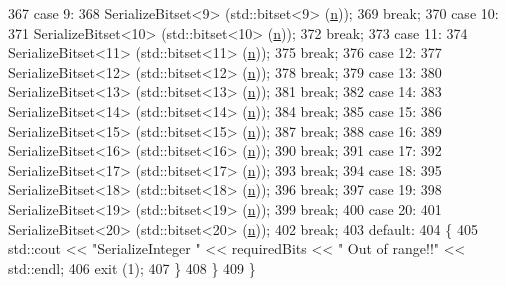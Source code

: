 \begin{DoxyCode}
367     \textcolor{keywordflow}{case} 9:
368       SerializeBitset<9> (std::bitset<9> (\hyperlink{namespacesample-rng-plot_aeb5ee5c431e338ef39b7ac5431242e1d}{n}));
369       \textcolor{keywordflow}{break};
370     \textcolor{keywordflow}{case} 10:
371       SerializeBitset<10> (std::bitset<10> (\hyperlink{namespacesample-rng-plot_aeb5ee5c431e338ef39b7ac5431242e1d}{n}));
372       \textcolor{keywordflow}{break};
373     \textcolor{keywordflow}{case} 11:
374       SerializeBitset<11> (std::bitset<11> (\hyperlink{namespacesample-rng-plot_aeb5ee5c431e338ef39b7ac5431242e1d}{n}));
375       \textcolor{keywordflow}{break};
376     \textcolor{keywordflow}{case} 12:
377       SerializeBitset<12> (std::bitset<12> (\hyperlink{namespacesample-rng-plot_aeb5ee5c431e338ef39b7ac5431242e1d}{n}));
378       \textcolor{keywordflow}{break};
379     \textcolor{keywordflow}{case} 13:
380       SerializeBitset<13> (std::bitset<13> (\hyperlink{namespacesample-rng-plot_aeb5ee5c431e338ef39b7ac5431242e1d}{n}));
381       \textcolor{keywordflow}{break};
382     \textcolor{keywordflow}{case} 14:
383       SerializeBitset<14> (std::bitset<14> (\hyperlink{namespacesample-rng-plot_aeb5ee5c431e338ef39b7ac5431242e1d}{n}));
384       \textcolor{keywordflow}{break};
385     \textcolor{keywordflow}{case} 15:
386       SerializeBitset<15> (std::bitset<15> (\hyperlink{namespacesample-rng-plot_aeb5ee5c431e338ef39b7ac5431242e1d}{n}));
387       \textcolor{keywordflow}{break};
388     \textcolor{keywordflow}{case} 16:
389       SerializeBitset<16> (std::bitset<16> (\hyperlink{namespacesample-rng-plot_aeb5ee5c431e338ef39b7ac5431242e1d}{n}));
390       \textcolor{keywordflow}{break};
391     \textcolor{keywordflow}{case} 17:
392       SerializeBitset<17> (std::bitset<17> (\hyperlink{namespacesample-rng-plot_aeb5ee5c431e338ef39b7ac5431242e1d}{n}));
393       \textcolor{keywordflow}{break};
394     \textcolor{keywordflow}{case} 18:
395       SerializeBitset<18> (std::bitset<18> (\hyperlink{namespacesample-rng-plot_aeb5ee5c431e338ef39b7ac5431242e1d}{n}));
396       \textcolor{keywordflow}{break};
397     \textcolor{keywordflow}{case} 19:
398       SerializeBitset<19> (std::bitset<19> (\hyperlink{namespacesample-rng-plot_aeb5ee5c431e338ef39b7ac5431242e1d}{n}));
399       \textcolor{keywordflow}{break};
400     \textcolor{keywordflow}{case} 20:
401       SerializeBitset<20> (std::bitset<20> (\hyperlink{namespacesample-rng-plot_aeb5ee5c431e338ef39b7ac5431242e1d}{n}));
402       \textcolor{keywordflow}{break};
403     \textcolor{keywordflow}{default}:
404       \{
405         std::cout << \textcolor{stringliteral}{"SerializeInteger "} << requiredBits << \textcolor{stringliteral}{" Out of range!!"} << std::endl;
406         exit (1);
407       \}
408     \}
409 \}
\end{DoxyCode}


